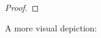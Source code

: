 
\begin{theorem}
\end{theorem}

\begin{proof}
\end{proof}

A more visual depiction:


\begin{align*}
\end{align*}
